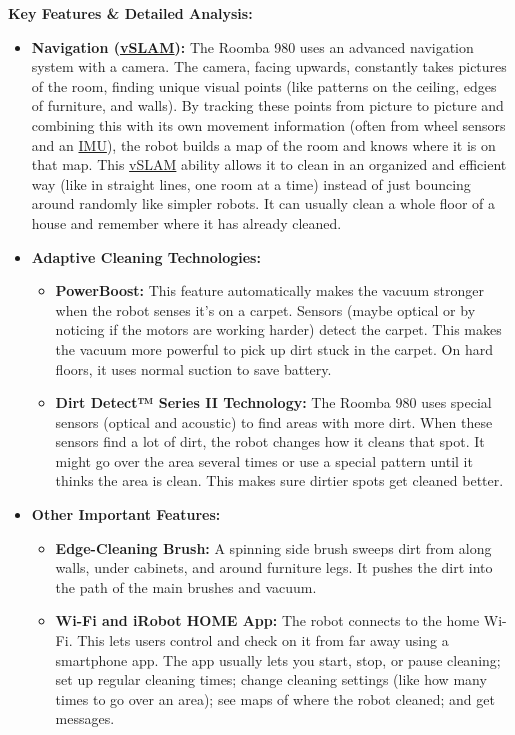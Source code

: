 \textbf{Key Features \& Detailed Analysis:}
\begin{itemize}
    \item \textbf{Navigation (\hyperref[term:vslam]{vSLAM}):} The Roomba 980 uses an advanced navigation system with a camera. The camera, facing upwards, constantly takes pictures of the room, finding unique visual points (like patterns on the ceiling, edges of furniture, and walls). By tracking these points from picture to picture and combining this with its own movement information (often from wheel sensors and an \hyperref[term:imu]{IMU}), the robot builds a map of the room and knows where it is on that map. This \hyperref[term:vslam]{vSLAM} ability allows it to clean in an organized and efficient way (like in straight lines, one room at a time) instead of just bouncing around randomly like simpler robots. It can usually clean a whole floor of a house and remember where it has already cleaned.
    \item \textbf{Adaptive Cleaning Technologies:}
        \begin{itemize}
            \item \textbf{PowerBoost:} This feature automatically makes the vacuum stronger when the robot senses it's on a carpet. Sensors (maybe optical or by noticing if the motors are working harder) detect the carpet. This makes the vacuum more powerful to pick up dirt stuck in the carpet. On hard floors, it uses normal suction to save battery.
            \item \textbf{Dirt Detect™ Series II Technology:} The Roomba 980 uses special sensors (optical and acoustic) to find areas with more dirt. When these sensors find a lot of dirt, the robot changes how it cleans that spot. It might go over the area several times or use a special pattern until it thinks the area is clean. This makes sure dirtier spots get cleaned better.
        \end{itemize}
    \item \textbf{Other Important Features:}
        \begin{itemize}
            \item \textbf{Edge-Cleaning Brush:} A spinning side brush sweeps dirt from along walls, under cabinets, and around furniture legs. It pushes the dirt into the path of the main brushes and vacuum.
            \item \textbf{Wi-Fi and iRobot HOME App:} The robot connects to the home Wi-Fi. This lets users control and check on it from far away using a smartphone app. The app usually lets you start, stop, or pause cleaning; set up regular cleaning times; change cleaning settings (like how many times to go over an area); see maps of where the robot cleaned; and get messages.

\end{itemize}
\end{itemize}
